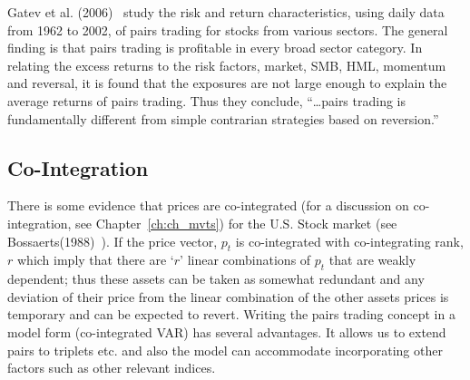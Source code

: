 \noindent{} \twomedskip


Gatev et al. (2006)~\cite{ggr} study the risk and return characteristics, using daily data from 1962 to 2002, of pairs trading for stocks from various sectors. The general finding is that pairs trading is profitable in every broad sector category. In relating the excess returns to the risk factors, market, SMB, HML, momentum and reversal, it is found that the exposures are not large enough to explain the average returns of pairs trading. Thus they conclude, ``\dots pairs trading is fundamentally different from simple contrarian strategies based on reversion.''


\subsection{Co-Integration}

There is some evidence that prices are co-integrated (for a discussion on co-integration, see Chapter~\ref{ch:ch_mvts}) for the U.S. Stock market (see Bossaerts(1988)~\cite{bossaerts1988common}). If the price vector, $p_t$ is co-integrated with co-integrating rank, $r$ which imply that there are `$r$' linear combinations of $p_t$ that are weakly dependent; thus these assets can be taken as somewhat redundant and any deviation of their price from the linear combination of the other assets prices is temporary and can be expected to revert. Writing the pairs trading concept in a model form (co-integrated VAR) has several advantages. It allows us to extend pairs to triplets etc. and also the model can accommodate incorporating other factors such as other relevant indices.



